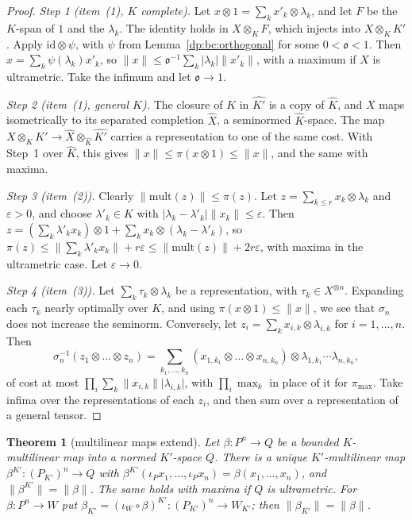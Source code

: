 \documentclass[11pt]{amsart}
\newtheorem{theorem}{Theorem}[section]
\theoremstyle{definition}
\theoremstyle{remark}
\numberwithin{equation}{section}
\newcommand{\id}{\mathrm{id}}
\newcommand{\abs}[1]{\lvert #1\rvert}
\newcommand{\norm}[1]{\lVert #1\rVert}
\newcommand{\Kh}{\widehat K}
\theoremstyle{plain}
\theoremstyle{definition}
\theoremstyle{plain}
\begin{document}
\begin{proof}
\emph{Step 1 (item~(1), $K$ complete).} Let $x\otimes1=\sum_kx'_k\otimes\lambda_k$, and let $F$ be the $K$-span of $1$ and the $\lambda_k$. The identity holds in $X\otimes_KF$, which injects into $X\otimes_KK'$. Apply $\id\otimes\psi$, with $\psi$ from Lemma~\ref{dp:bc:orthogonal} for some $0<\mathfrak o<1$. Then $x=\sum_k\psi(\lambda_k)x'_k$, so $\norm x\le\mathfrak o^{-1}\sum_k\abs{\lambda_k}\norm{x'_k}$, with a maximum if $X$ is ultrametric. Take the infimum and let $\mathfrak o\to1$.

\emph{Step 2 (item~(1), general $K$).} The closure of $K$ in $\widehat{K'}$ is a copy of $\Kh$, and $X$ maps isometrically to its separated completion $\widehat X$, a seminormed $\Kh$-space. The map $X\otimes_KK'\to\widehat X\otimes_{\Kh}\widehat{K'}$ carries a representation to one of the same cost. With Step~1 over $\Kh$, this gives $\norm x\le\pi(x\otimes1)\le\norm x$, and the same with maxima.

\emph{Step 3 (item~(2)).} Clearly $\norm{\mathrm{mult}(z)}\le\pi(z)$. Let $z=\sum_{k\le r}x_k\otimes\lambda_k$ and $\varepsilon>0$, and choose $\lambda'_k\in K$ with $\abs{\lambda_k-\lambda'_k}\norm{x_k}\le\varepsilon$. Then $z=(\sum_k\lambda'_kx_k)\otimes1+\sum_kx_k\otimes(\lambda_k-\lambda'_k)$, so $\pi(z)\le\norm{\sum_k\lambda'_kx_k}+r\varepsilon\le\norm{\mathrm{mult}(z)}+2r\varepsilon$, with maxima in the ultrametric case. Let $\varepsilon\to0$.

\emph{Step 4 (item~(3)).} Let $\sum_k\tau_k\otimes\lambda_k$ be a representation, with $\tau_k\in X^{\otimes n}$. Expanding each $\tau_k$ nearly optimally over $K$, and using $\pi(x\otimes1)\le\norm x$, we see that $\sigma_n$ does not increase the seminorm. Conversely, let $z_i=\sum_kx_{i,k}\otimes\lambda_{i,k}$ for $i=1,\dots,n$. Then
\begin{equation}\label{dp:bc:sigma-inverse}
 \sigma_n^{-1}(z_1\otimes\dots\otimes z_n)=\sum_{k_1,\dots,k_n}(x_{1,k_1}\otimes\dots\otimes x_{n,k_n})\otimes\lambda_{1,k_1}\cdots\lambda_{n,k_n},
\end{equation}
of cost at most $\prod_i\sum_k\norm{x_{i,k}}\abs{\lambda_{i,k}}$, with $\prod_i\max_k$ in place of it for $\pi_{\max}$. Take infima over the representations of each $z_i$, and then sum over a representation of a general tensor.
\end{proof}

\begin{theorem}[multilinear maps extend]\label{dp:thm:base-change-multilinear}
Let $\beta\colon P^n\to Q$ be a bounded $K$-multilinear map into a normed $K'$-space $Q$. There is a unique $K'$-multilinear map $\beta^{K'}\colon(P_{K'})^n\to Q$ with $\beta^{K'}(\iota_Px_1,\dots,\iota_Px_n)=\beta(x_1,\dots,x_n)$, and $\norm{\beta^{K'}}=\norm\beta$. The same holds with maxima if $Q$ is ultrametric. For $\beta\colon P^n\to W$ put $\beta_{K'}=(\iota_W\circ\beta)^{K'}\colon(P_{K'})^n\to W_{K'}$; then $\norm{\beta_{K'}}=\norm\beta$.
\end{theorem}
\end{document}
